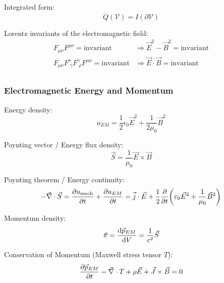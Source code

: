 		\noindent
		Integrated form:
		\begin{equation}
			\dot{Q}(\mathcal{V}) = I(\partial\mathcal{V})
		\end{equation}

		\noindent
		Lorentz invariants of the electromagnetic field:
		\begin{equation}
			\begin{aligned}
				F_{\mu\nu} F^{\mu\nu} = \mathrm{invariant} &\Rightarrow \vec{E}^2 - \vec{B}^2 = \mathrm{invariant} \\
				F_{\mu\nu} F^{\nu}_{\;\gamma} F^{\gamma}_{\;\rho} F^{\rho\mu} = \mathrm{invariant} &\Rightarrow \vec{E}\cdot \vec{B} = \mathrm{invariant} \\
			\end{aligned}
		\end{equation}

		\subsubsection{Electromagnetic Energy and Momentum}
			\noindent
			Energy density:
			\begin{equation}
				u_{EM}=\frac{1}{2}\epsilon_0 \vec{E}^2+\frac{1}{2\mu_0}\vec{B}^2
			\end{equation}

			\noindent
			Poynting vector / Energy flux density:
			\begin{equation}
				\vec{S} = \frac{1}{\mu_0}\vec{E}\times\vec{B}
			\end{equation}

			\noindent
			Poynting theorem / Energy continuity:
			\begin{equation}
				-\vec{\nabla}\cdot\vec{S}
				= \pdv{u_{\mathrm{mech}}}{t} + \pdv{u_{EM}}{t}
				= \vec{j}\cdot\vec{E} + \frac{1}{2}\pdv{t}\qty(\varepsilon_0\vec{E}^2 + \frac{1}{\mu_0}\vec{B}^2)
			\end{equation}

			\noindent
			Momentum density:
			\begin{equation}
				\vec{\pi} = \dv{\vec{p}_{EM}}{V} = \frac{1}{c^2}\vec{S}
			\end{equation}

			\noindent
			Conservation of Momentum (Maxwell stress tensor $T$):
			\begin{equation}
				\pdv{\vec{p}_{EM}}{t} - \vec{\nabla}\cdot T + \rho \vec{E} + \vec{J}\times\vec{B} = 0
			\end{equation}


